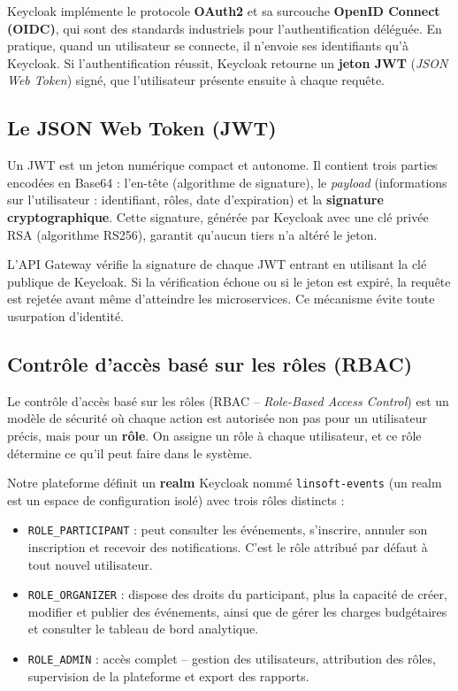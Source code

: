 \documentclass[12pt,a4paper]{report}
\begin{document}
Keycloak impl\'emente le protocole \textbf{OAuth2} et sa surcouche \textbf{OpenID Connect
(OIDC)}, qui sont des standards industriels pour l'authentification d\'el\'egu\'ee. En
pratique, quand un utilisateur se connecte, il n'envoie ses identifiants qu'\`a Keycloak.
Si l'authentification r\'eussit, Keycloak retourne un \textbf{jeton JWT} (\textit{JSON
Web Token}) sign\'e, que l'utilisateur pr\'esente ensuite \`a chaque requ\^ete.

\subsection{Le JSON Web Token (JWT)}

Un JWT est un jeton num\'erique compact et autonome. Il contient trois parties encod\'ees
en Base64 : l'en-t\^ete (algorithme de signature), le \textit{payload} (informations sur
l'utilisateur : identifiant, r\^oles, date d'expiration) et la \textbf{signature
cryptographique}. Cette signature, g\'en\'er\'ee par Keycloak avec une cl\'e priv\'ee RSA
(algorithme RS256), garantit qu'aucun tiers n'a alt\'er\'e le jeton.

L'API Gateway v\'erifie la signature de chaque JWT entrant en utilisant la cl\'e publique
de Keycloak. Si la v\'erification \'echoue ou si le jeton est expir\'e, la requ\^ete est
rejet\'ee avant m\^eme d'atteindre les microservices. Ce m\'ecanisme \'evite toute usurpation
d'identit\'e.

\subsection{Contr\^ole d'acc\`es bas\'e sur les r\^oles (RBAC)}

Le contr\^ole d'acc\`es bas\'e sur les r\^oles (RBAC -- \textit{Role-Based Access Control})
est un mod\`ele de s\'ecurit\'e o\`u chaque action est autoris\'ee non pas pour un utilisateur
pr\'ecis, mais pour un \textbf{r\^ole}. On assigne un r\^ole \`a chaque utilisateur, et
ce r\^ole d\'etermine ce qu'il peut faire dans le syst\`eme.

Notre plateforme d\'efinit un \textbf{realm} Keycloak nomm\'e \texttt{linsoft-events}
(un realm est un espace de configuration isol\'e) avec trois r\^oles distincts :

\begin{itemize}[noitemsep]
  \item \texttt{ROLE\_PARTICIPANT} : peut consulter les \'ev\'enements, s'inscrire,
  annuler son inscription et recevoir des notifications. C'est le r\^ole attribu\'e
  par d\'efaut \`a tout nouvel utilisateur.
  \item \texttt{ROLE\_ORGANIZER} : dispose des droits du participant, plus la capacit\'e
  de cr\'eer, modifier et publier des \'ev\'enements, ainsi que de g\'erer les charges
  budg\'etaires et consulter le tableau de bord analytique.
  \item \texttt{ROLE\_ADMIN} : acc\`es complet -- gestion des utilisateurs, attribution
  des r\^oles, supervision de la plateforme et export des rapports.
\end{itemize}
\end{document}
